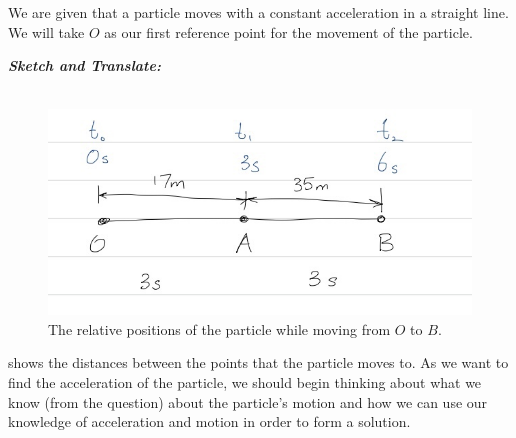 %
%
%


\begin{subquestions}
	
\subquestion

We are given that a particle moves with a constant acceleration in a straight line. We will take $O$ as our first reference point for the movement of the particle.

\begin{subsubquestions}
	
\subsubquestion

\textbf{\textit{Sketch and Translate:}} \\ \\
\begin{figure}[H]
	\begin{center}
		\includegraphics[scale=0.5]{../2010/figures/2010q5}
		\caption{\label{2010:q5:Move1} The relative positions of the particle while moving from $O$ to $B$.}
	\end{center}
\end{figure}
 shows the distances between the points that the particle moves to. As we want to find the acceleration of the particle, we should begin thinking about what we know (from the question) about the particle's motion and how we can use our knowledge of acceleration and motion in order to form a solution.






\end{subsubquestions}
\end{subquestions}
